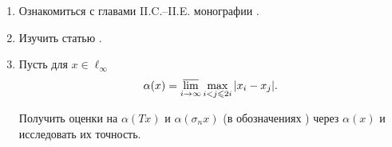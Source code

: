 \documentclass[a4paper,openbib]{report}
\renewcommand{\leq}{\leqslant}
\begin{document}


\begin{enumerate}
	\item
		Ознакомиться с главами II.C.--II.E. монографии \cite{wojtaszczyk1996banach}.
	\item
		Изучить статью \cite{Semenov2010invariant}.
	\item
		Пусть для $x\in\ell_\infty$
		$$
			\alpha(x) = \varlimsup_{i\to\infty} \max_{i < j \leq 2i} |x_i-x_j|
			.
		$$

		Получить оценки на $\alpha(Tx)$ и $\alpha(\sigma_n x)$ (в обозначениях \cite{Semenov2010invariant})
		через $\alpha(x)$
		и исследовать их точность.
\end{enumerate}

\begingroup
	\let\clearpage\relax
	\printbibliography[title={\large Список литературы}]
\endgroup
\end{document}
